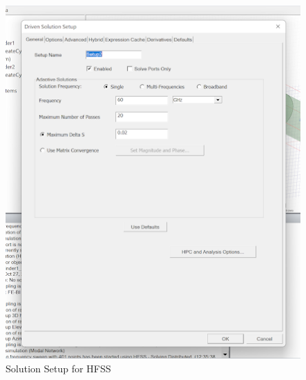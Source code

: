 \documentclass[a4paper,12pt]{report}
\begin{document}
\begin{figure}
\begin{minipage}{0.45\textwidth}
    \includegraphics[clip, keepaspectratio, width=0.9\linewidth]{img/hfss_driven_solution_setup.png}
    \caption{Solution Setup for HFSS}
    \label{fig:hfss_driven_solution_setup}
  \end{minipage}\hfill
\end{figure}
\end{document}
